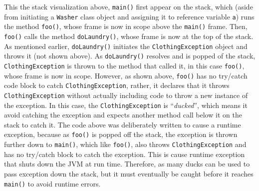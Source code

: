 \documentclass{tufte-handout}
\begin{document}
    This the stack visualization above, \texttt{main()} first appear on the stack, which (aside from initiating a \texttt{Washer} class object and assigning it to reference variable \texttt{a}) runs the method \texttt{foo()}, whose frame is now in scope above the \texttt{main()} frame. Then, \texttt{foo()} calls the method \texttt{doLaundry()}, whose frame is now at the top of the stack. As mentioned earlier, \texttt{doLaundry()} initiates the \texttt{ClothingException} object and throws it (not shown above). As \texttt{doLaundry()} resolves and is popped of the stack, \texttt{ClothingException} is thrown to the method that called it, in this case \texttt{foo()}, whose frame is now in scope. However, as shown above, \texttt{foo()} has no try/catch code block to catch \texttt{ClothingException}, rather, it declares that it throws \texttt{ClothingException} without actually including code to throw a new instance of the exception. In this case, the \texttt{ClothingException} is ``\emph{ducked}'', which means it avoid catching the exception and expects another method call below it on the stack to catch it. The code above was deliberately written to cause a runtime exception, because as \texttt{foo()} is popped off the stack, the exception is thrown further down to \texttt{main()}, which like \texttt{foo()}, also throws \texttt{ClothingException} and has no try/catch block to catch the exception. This is cause runtime exception that shuts down the JVM at run time. Therefore, as many ducks can be used to pass exception down the stack, but it must eventually be caught before it reaches \texttt{main()} to avoid runtime errors.  
\end{document}
